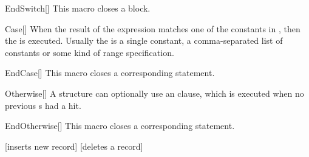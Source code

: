 \documentclass[a4paper, 11pt]{article}
\begin{document}
\begin{macro}{EndSwitch}[]
    This macro closes a  block.

    \MacroOptionsText
\end{macro}

\begin{macro}{Case}[]
    When the result of the  expression matches one of the constants in , then the  is executed. Usually the  is a single constant, a comma-separated list of constants or some kind of range specification.

    \BlockOptionsText
\end{macro}

\begin{macro}{EndCase}[]
    This macro closes a corresponding  statement.

    \MacroOptionsText
\end{macro}

\begin{macro}{Otherwise}[]
    A  structure can optionally use an  clause, which is executed when no previous s had a hit.

    \BlockOptionsText
\end{macro}

\begin{macro}{EndOtherwise}[]
    This macro closes a corresponding  statement.

    \MacroOptionsText
\end{macro}

\begin{tcblisting}{}
    \begin{algorithmic}
            [inserts new record]
            \EndCase
            [deletes a record]
            \EndCase
            \Otherwise
            \EndOtherwise
        \EndSwitch
    \end{algorithmic}
\end{tcblisting}
\end{document}
